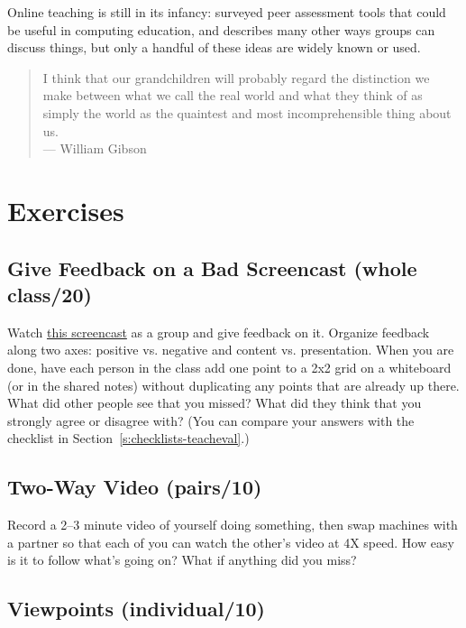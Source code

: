 Online teaching is still in its infancy: \cite{Luxt2009} surveyed
peer assessment tools that could be useful in computing education, and
\cite{Broo2016} describes many other ways groups can discuss things,
but only a handful of these ideas are widely known or used.

\begin{quote}

  I think that our grandchildren will probably regard
  the distinction we make between what we call the real world
  and what they think of as simply the world
  as the quaintest and most incomprehensible thing about us. \\
  --- William Gibson

\end{quote}

\section{Exercises}\label{s:online-exercises}

\subsection*{Give Feedback on a Bad Screencast (whole class/20)}

Watch \href{https://youtu.be/xcnoHaxXvdQ}{this screencast} as a group and give
feedback on it. Organize feedback along two axes: positive
vs. negative and content vs. presentation. When you are done, have
each person in the class add one point to a 2x2 grid on a whiteboard
(or in the shared notes) without duplicating any points that are
already up there. What did other people see that you missed? What did
they think that you strongly agree or disagree with? (You can compare
your answers with the checklist in Section~\ref{s:checklists-teacheval}.)

\subsection*{Two-Way Video (pairs/10)}

Record a 2--3 minute video of yourself doing something, then swap
machines with a partner so that each of you can watch the other's video
at 4X speed. How easy is it to follow what's going on? What if anything
did you miss?

\subsection*{Viewpoints (individual/10)}

